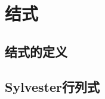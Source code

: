 \section{结式}\label{s:5.2}

\subsection{结式的定义}\label{s:5.2.1}

\subsection{Sylvester行列式}\label{s:5.2.2}